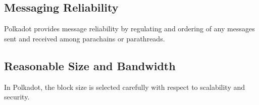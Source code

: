 \subsection{Messaging Reliability} Polkadot provides message reliability by regulating and ordering of any messages sent and received among parachains or parathreads.

\subsection{Reasonable Size and Bandwidth} In Polkadot, the block size is selected carefully with respect to scalability and security. 



